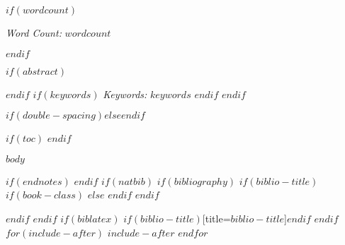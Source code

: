 \documentclass[twoside, $if(fontsize)$$fontsize$,$endif$$if(papersize)$$papersize$,$endif$$for(classoption)$$classoption$$sep$,$endfor$]{article}
\begin{document}
	$if(wordcount)$
	\begin{center}
		\textit{Word Count:} $wordcount$
	\end{center}
	$endif$
	
	$if(abstract)$
	\begin{abstract}
		\noindent\normalsize $abstract$
	\end{abstract}
	$endif$
	\vspace*{8pt}
	$if(keywords)$
	\textit{Keywords:} \textit{$keywords$}
	$endif$
	\vspace*{10pt}
	$endif$
	
	\newpage
	
	$if(double-spacing)$\doublespacing$else$\onehalfspacing$endif$

	$if(toc)$
		\tableofcontents
		\newpage
	$endif$
	
	\fontsize{$fontsize$}{$fontsize$} $body$
	
	$if(endnotes)$
	\newpage
	\theendnotes
	$endif$
	\newpage
	\singlespacing
	$if(natbib)$
	$if(bibliography)$
	$if(biblio-title)$
	$if(book-class)$
	\renewcommand\bibname{$biblio-title$}
	$else$
	\renewcommand\refname{$biblio-title$}
	$endif$
	$endif$
	
	$endif$
	$endif$
	$if(biblatex)$
	\printbibliography$if(biblio-title)$[title=$biblio-title$]$endif$
	$endif$
	$for(include-after)$
	$include-after$
	$endfor$
	
\end{document}
